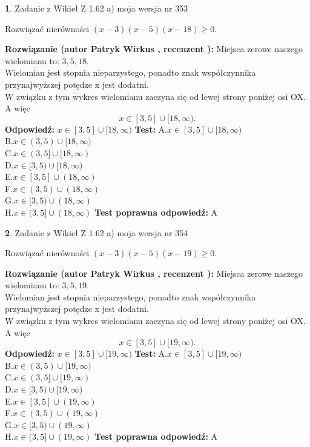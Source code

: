 \documentclass[12pt, a4paper]{article}
\theoremstyle{definition} %
\newtheorem{zad}{}
\newcommand{\zadStart}[1]{\begin{zad}#1\newline}
\newcommand{\zadStop}{\end{zad}}
\newcommand{\rozwStart}[2]{\noindent \textbf{Rozwiązanie (autor #1 , recenzent #2): }\newline}
\newcommand{\rozwStop}{\newline}
\newcommand{\odpStart}{\noindent \textbf{Odpowiedź:}\newline}
\newcommand{\odpStop}{\newline}
\newcommand{\testStart}{\noindent \textbf{Test:}\newline}
\newcommand{\testStop}{\newline}
\newcommand{\kluczStart}{\noindent \textbf{Test poprawna odpowiedź:}\newline}
\newcommand{\kluczStop}{\newline}
\begin{document}
\zadStart{Zadanie z Wikieł Z 1.62 a) moja wersja nr 353}

Rozwiązać nierówności $(x-3)(x-5)(x-18)\ge0$.
\zadStop
\rozwStart{Patryk Wirkus}{}
Miejsca zerowe naszego wielomianu to: $3, 5, 18$.\\
Wielomian jest stopnia nieparzystego, ponadto znak współczynnika przy\linebreak najwyższej potędze x jest dodatni.\\ W związku z tym wykres wielomianu zaczyna się od lewej strony poniżej osi OX. A więc $$x \in [3,5] \cup [18,\infty).$$
\rozwStop
\odpStart
$x \in [3,5] \cup [18,\infty)$
\odpStop
\testStart
A.$x \in [3,5] \cup [18,\infty)$\\
B.$x \in (3,5) \cup [18,\infty)$\\
C.$x \in (3,5] \cup [18,\infty)$\\
D.$x \in [3,5) \cup [18,\infty)$\\
E.$x \in [3,5] \cup (18,\infty)$\\
F.$x \in (3,5) \cup (18,\infty)$\\
G.$x \in [3,5) \cup (18,\infty)$\\
H.$x \in (3,5] \cup (18,\infty)$
\testStop
\kluczStart
A
\kluczStop



\zadStart{Zadanie z Wikieł Z 1.62 a) moja wersja nr 354}

Rozwiązać nierówności $(x-3)(x-5)(x-19)\ge0$.
\zadStop
\rozwStart{Patryk Wirkus}{}
Miejsca zerowe naszego wielomianu to: $3, 5, 19$.\\
Wielomian jest stopnia nieparzystego, ponadto znak współczynnika przy\linebreak najwyższej potędze x jest dodatni.\\ W związku z tym wykres wielomianu zaczyna się od lewej strony poniżej osi OX. A więc $$x \in [3,5] \cup [19,\infty).$$
\rozwStop
\odpStart
$x \in [3,5] \cup [19,\infty)$
\odpStop
\testStart
A.$x \in [3,5] \cup [19,\infty)$\\
B.$x \in (3,5) \cup [19,\infty)$\\
C.$x \in (3,5] \cup [19,\infty)$\\
D.$x \in [3,5) \cup [19,\infty)$\\
E.$x \in [3,5] \cup (19,\infty)$\\
F.$x \in (3,5) \cup (19,\infty)$\\
G.$x \in [3,5) \cup (19,\infty)$\\
H.$x \in (3,5] \cup (19,\infty)$
\testStop
\kluczStart
A
\kluczStop
\end{document}
